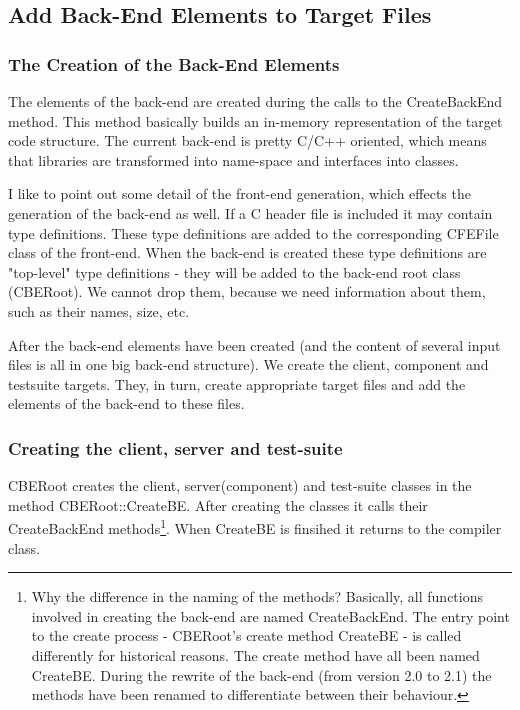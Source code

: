 \subsection{Add Back-End Elements to Target Files}

\subsubsection{The Creation of the Back-End Elements}

The elements of the back-end are created during the calls to the
CreateBackEnd method. This method basically builds an in-memory
representation of the target code structure. The current back-end is
pretty C/C++ oriented, which means that libraries are transformed into
name-space and interfaces into classes.

I like to point out some detail of the front-end generation, which
effects the generation of the back-end as well. If a C header file is
included it may contain type definitions. These type definitions are
added to the corresponding CFEFile class of the front-end. When the
back-end is created these type definitions are "top-level" type
definitions - they will be added to the back-end root class
(CBERoot). We cannot drop them, because we need information about
them, such as their names, size, etc.

After the back-end elements have been created (and the content of
several input files is all in one big back-end structure). We create
the client, component and testsuite targets. They, in turn, create
appropriate target files and add the elements of the back-end to these
files.

\subsubsection{Creating the client, server and test-suite}

CBERoot creates the client, server(component) and test-suite classes
in the method CBERoot::CreateBE. After creating the classes it calls
their CreateBackEnd methods\footnote{Why the difference in the naming
of the methods? Basically, all functions involved in creating the
back-end are named CreateBackEnd. The entry point to the create
process - CBERoot's create method CreateBE - is called differently for
historical reasons. The create method have all been named
CreateBE. During the rewrite of the back-end (from version 2.0 to 2.1)
the methods have been renamed to differentiate between their
behaviour.}. When CreateBE is finsihed it returns to the compiler
class.

